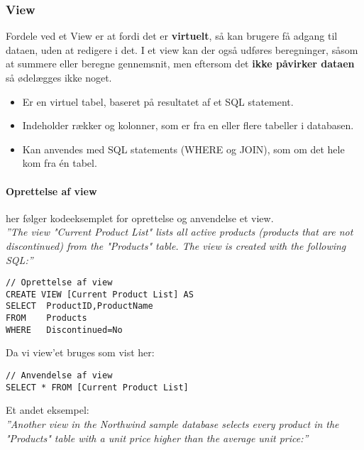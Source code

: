 \subsubsection{View}
 Fordele ved et View er at fordi det er \textbf{virtuelt}, så kan brugere få adgang til dataen, uden at redigere i det. I et view kan der også udføres beregninger, såsom at summere eller beregne gennemsnit, men eftersom det \textbf{ikke påvirker dataen} så ødelægges ikke noget.

\begin{itemize}
	\item Er en virtuel tabel, baseret på resultatet af et SQL statement.
	\item Indeholder rækker og kolonner, som er fra en eller flere tabeller i databasen.
	\item Kan anvendes med SQL statements (WHERE og JOIN), som om det hele kom fra én tabel.
\end{itemize}

\paragraph{Oprettelse af view} her følger kodeeksemplet for oprettelse og anvendelse et view. \\

\textit{''The view "Current Product List" lists all active products (products that are not discontinued) from the "Products" table. The view is created with the following SQL:''}

\begin{lstlisting}[caption=Kodeeksempel for oprettelse af View.,label=code:view,morekeywords={CREATE, VIEW, AS, SELECT, FROM, WHERE}]
// Oprettelse af view
CREATE VIEW [Current Product List] AS
SELECT 	ProductID,ProductName
FROM 	Products
WHERE 	Discontinued=No
\end{lstlisting}

Da vi view'et bruges som vist her: 

\begin{lstlisting}[caption=Kodeeksempel for anvendelse af View.,label=code:view]
// Anvendelse af view
SELECT * FROM [Current Product List]
\end{lstlisting}

Et andet eksempel:\\

\textit{''Another view in the Northwind sample database selects every product in the "Products" table with a unit price higher than the average unit price:''}

